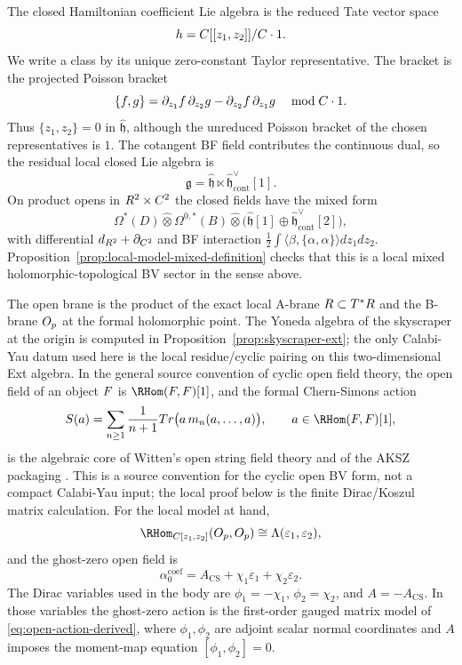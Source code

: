 \documentclass[11pt]{memoir}
\begin{document}
The closed Hamiltonian coefficient Lie algebra is the reduced Tate vector
space
$$h=C[[z_1,z_2]]/C\cdot1.$$
We write a class by its unique zero-constant Taylor representative. The
bracket is the projected Poisson bracket
$$\{f,g\}=\partial_{z_1}f\,\partial_{z_2}g
  -\partial_{z_2}f\,\partial_{z_1}g\quad \bmod C\cdot1.$$
Thus $\{z_1,z_2\}=0$ in $\widehat{\mathfrak h}$, although the unreduced
Poisson bracket of the chosen representatives is $1$. The cotangent BF
field contributes the continuous dual, so the residual local closed Lie
algebra is
$$\mathfrak g=\widehat{\mathfrak h}\ltimes
  \widehat{\mathfrak h}^{\vee}_{\mathrm{cont}}[1].$$
On product opens in $R^2\times C^2$ the closed fields have the mixed form
$$\Omega^*(D)\widehat\otimes\Omega^{0,*}(B)\widehat\otimes
  \bigl(\widehat{\mathfrak h}[1]\oplus
  \widehat{\mathfrak h}^{\vee}_{\mathrm{cont}}[2]\bigr),$$
with differential $d_{R^2}+\partial_{C^2}$ and BF interaction
$\frac12\int\langle\beta,\{\alpha,\alpha\}\rangle dz_1dz_2$.
Proposition~\ref{prop:local-model-mixed-definition} checks that this is a
local mixed holomorphic-topological BV sector in the sense above.

The open brane is the product of the exact local A-brane
$R\subset T^*R$ and the B-brane $O_p$ at the formal holomorphic
point. The Yoneda algebra of the skyscraper at the origin is computed in
Proposition~\ref{prop:skyscraper-ext}; the only Calabi-Yau datum used
here is the local residue/cyclic pairing on this two-dimensional Ext
algebra.  In the general source convention of cyclic open field theory,
the open field of an object $F$ is $\RHom(\mc F,\mc F)[1]$, and the
formal Chern-Simons action
$$S(a)=\sum_{n\geq1}\frac{1}{n+1}
  \mathrm{Tr}\bigl(a\,m_n(a,\ldots,a)\bigr),\qquad a\in\RHom(\mc F,\mc F)[1],$$
is the algebraic core of Witten's open string field theory
\cite{witten-cs} and of the AKSZ packaging \cite{aksz}.  This is a
source convention for the cyclic open BV form, not a compact
Calabi-Yau input; the local proof below is the finite Dirac/Koszul
matrix calculation.  For the local model at hand,
$$\RHom_{\C[z_1,z_2]}(\mc O_p,\mc O_p)
  \cong\Lambda(\varepsilon_1,\varepsilon_2),$$
and the ghost-zero open field is
$$\alpha_0^{\mathrm{coef}}
  =A_{\mathrm{CS}}+\chi_1\varepsilon_1+\chi_2\varepsilon_2.$$
The Dirac variables used in the body are
\(\phi_1=-\chi_1\), \(\phi_2=\chi_2\), and
\(A=-A_{\mathrm{CS}}\).  In those variables the ghost-zero action is
the first-order gauged matrix model of \eqref{eq:open-action-derived},
where $\phi_1,\phi_2$ are adjoint scalar normal coordinates and $A$
imposes the moment-map equation $[\phi_1,\phi_2]=0$.
\end{document}
